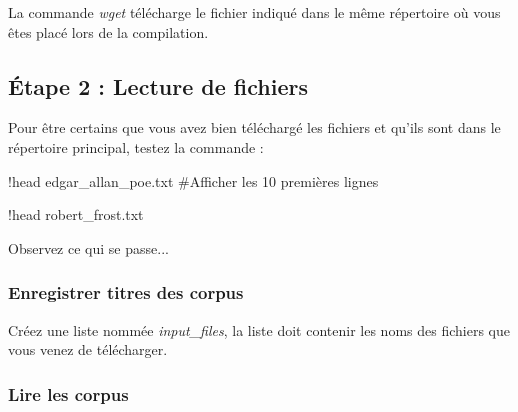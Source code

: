 La commande \textit{wget} télécharge le fichier indiqué dans le même répertoire où vous êtes placé lors de la compilation.

\subsection{Étape 2 : Lecture de fichiers}

Pour être certains que vous avez bien téléchargé les fichiers et qu'ils sont dans le répertoire principal, testez la commande :

\begin{python} 
!head edgar_allan_poe.txt #Afficher les 10 premières lignes

!head robert_frost.txt
\end{python}

Observez ce qui se passe...


\subsubsection{Enregistrer titres des corpus}

Créez une liste nommée \textit{input\_files}, la liste doit contenir les noms des fichiers que vous venez de télécharger.%


\subsubsection{Lire les corpus}

